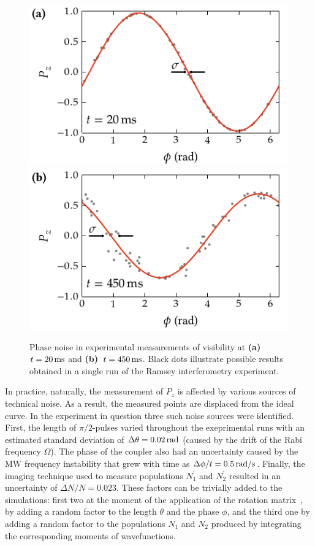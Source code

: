\begin{figure}
    \centerline{%
    \includegraphics{figures_generated/bec_noise/illustration_noise_20ms.pdf}%
    \includegraphics{figures_generated/bec_noise/illustration_noise_450ms.pdf}}

    \caption{Phase noise in experimental measurements of visibility at \textbf{(a)}~$t = 20\mbox{\ensuremath{\,\mathrm{ms}}}$ and \textbf{(b)}~$t = 450\mbox{\ensuremath{\,\mathrm{ms}}}$.
    Black dots illustrate possible results obtained in a single run of the Ramsey interferometry experiment.}%

    \label{fig:bec-noise:phase-noise:illustration}
\end{figure}

In practice, naturally, the measurement of $P_z$ is affected by various sources of technical noise.
As a result, the measured points are displaced from the ideal curve.
In the experiment in question three such noise sources were identified.
First, the length of $\pi/2$-pulses varied throughout the exeprimental runs with an estimated standard deviation of $\Delta \theta = 0.02\mbox{\ensuremath{\,\mathrm{rad}}}$ (caused by the drift of the Rabi frequency $\Omega$).
The phase of the coupler also had an uncertainty caused by the MW frequency instability that grew with time as $\Delta \phi / t = 0.5\mbox{\ensuremath{\,\mathrm{rad/s}}}$.
Finally, the imaging technique used to measure populations $N_1^\prime$ and $N_2^\prime$ resulted in an uncertainty of $\Delta N / N = 0.023$.
These factors can be trivially added to the simulations: first two at the moment of the application of the rotation matrix~, by adding a random factor to the length $\theta$ and the phase $\phi$, and the third one by adding a random factor to the populations $N_1$ and $N_2$ produced by integrating the corresponding moments of wavefunctions.


